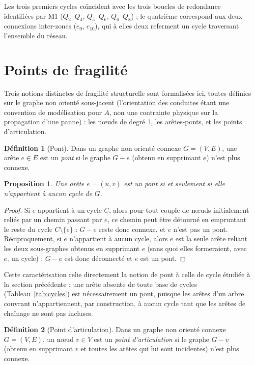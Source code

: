\documentclass[11pt,a4paper]{article}
\theoremstyle{plain}
\newtheorem{proposition}{Proposition}
\theoremstyle{definition}
\newtheorem{definition}{Définition}
\theoremstyle{remark}
\begin{document}
Les trois premiers cycles coïncident avec les trois boucles de redondance
identifiées par M1 ($Q_2$--$Q_4$, $Q_5$--$Q_6$, $Q_6$--$Q_8$) ; le
quatrième correspond aux deux connexions inter-zones ($e_9$, $e_{10}$),
qui à elles deux referment un cycle traversant l'ensemble du réseau.

\section{Points de fragilité}
\label{sec:ponts}

Trois notions distinctes de fragilité structurelle sont formalisées ici,
toutes définies sur le graphe non orienté sous-jacent (l'orientation des
conduites étant une convention de modélisation pour $A$, non une contrainte
physique sur la propagation d'une panne) : les nœuds de degré 1, les
arêtes-ponts, et les points d'articulation.

\begin{definition}[Pont]
Dans un graphe non orienté connexe $G = (V,E)$, une arête $e \in E$ est un
\emph{pont} si le graphe $G - e$ (obtenu en supprimant $e$) n'est plus
connexe.
\end{definition}

\begin{proposition}
Une arête $e = (u,v)$ est un pont si et seulement si elle n'appartient à
aucun cycle de $G$.
\end{proposition}

\begin{proof}
Si $e$ appartient à un cycle $C$, alors pour tout couple de nœuds
initialement reliés par un chemin passant par $e$, ce chemin peut être
détourné en empruntant le reste du cycle $C \setminus \{e\}$ : $G - e$
reste donc connexe, et $e$ n'est pas un pont. Réciproquement, si $e$
n'appartient à aucun cycle, alors $e$ est la seule arête reliant les deux
sous-graphes obtenus en supprimant $e$ (sans quoi elles formeraient, avec
$e$, un cycle) ; $G - e$ est donc déconnecté et $e$ est un pont.
\end{proof}

Cette caractérisation relie directement la notion de pont à celle de cycle
étudiée à la section précédente : une arête absente de toute base de
cycles (Tableau~\ref{tab:cycles}) est nécessairement un pont, puisque les
arêtes d'un arbre couvrant n'appartiennent, par construction, à aucun
cycle tant que les arêtes de chaînage ne sont pas incluses.

\begin{definition}[Point d'articulation]
Dans un graphe non orienté connexe $G = (V,E)$, un nœud $v \in V$ est un
\emph{point d'articulation} si le graphe $G - v$ (obtenu en supprimant $v$
et toutes les arêtes qui lui sont incidentes) n'est plus connexe.
\end{definition}
\end{document}
